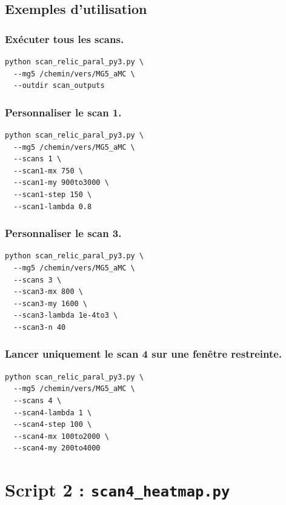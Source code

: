\documentclass[11pt,a4paper]{article}
\newcommand{\script}[1]{\texttt{#1}}
\begin{document}
\subsection{Exemples d'utilisation}

\subsubsection*{Exécuter tous les scans.}
\begin{lstlisting}[style=bashstyle]
python scan_relic_paral_py3.py \
  --mg5 /chemin/vers/MG5_aMC \
  --outdir scan_outputs
\end{lstlisting}

\subsubsection*{Personnaliser le scan 1.}
\begin{lstlisting}[style=bashstyle]
python scan_relic_paral_py3.py \
  --mg5 /chemin/vers/MG5_aMC \
  --scans 1 \
  --scan1-mx 750 \
  --scan1-my 900to3000 \
  --scan1-step 150 \
  --scan1-lambda 0.8
\end{lstlisting}

\subsubsection*{Personnaliser le scan 3.}
\begin{lstlisting}[style=bashstyle]
python scan_relic_paral_py3.py \
  --mg5 /chemin/vers/MG5_aMC \
  --scans 3 \
  --scan3-mx 800 \
  --scan3-my 1600 \
  --scan3-lambda 1e-4to3 \
  --scan3-n 40
\end{lstlisting}

\subsubsection*{Lancer uniquement le scan 4 sur une fenêtre restreinte.}
\begin{lstlisting}[style=bashstyle]
python scan_relic_paral_py3.py \
  --mg5 /chemin/vers/MG5_aMC \
  --scans 4 \
  --scan4-lambda 1 \
  --scan4-step 100 \
  --scan4-mx 100to2000 \
  --scan4-my 200to4000
\end{lstlisting}

\section{Script 2 : \script{scan4\_heatmap.py}}
\end{document}

